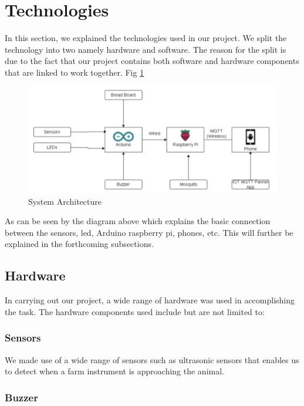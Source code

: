 \documentclass[12pt]{article}
\begin{document}
\section{Technologies}

In this section, we explained the technologies used in our project. We split the technology into two namely hardware and software. The reason for the split is due to the fact that our project contains both software and hardware components that are linked to work together. Fig \ref{fig::architecture} 

\begin{figure}[!h]
\includegraphics[scale=0.55]{img/architecture.png}
\caption{System Architecture}
\label{fig::architecture}
\end{figure}

As can be seen by the diagram above which explains the basic connection between the sensors, led, Arduino raspberry pi, phones, etc. This will further be explained in the forthcoming subsections. 

\subsection{Hardware} 

In carrying out our project, a wide range of hardware was used in accomplishing the task. The hardware components used include but are not limited to:

\subsubsection{Sensors}

We made use of a wide range of sensors such as ultrasonic sensors that enables us to detect when a farm instrument is approaching the animal.

\subsubsection{Buzzer}
\end{document}
